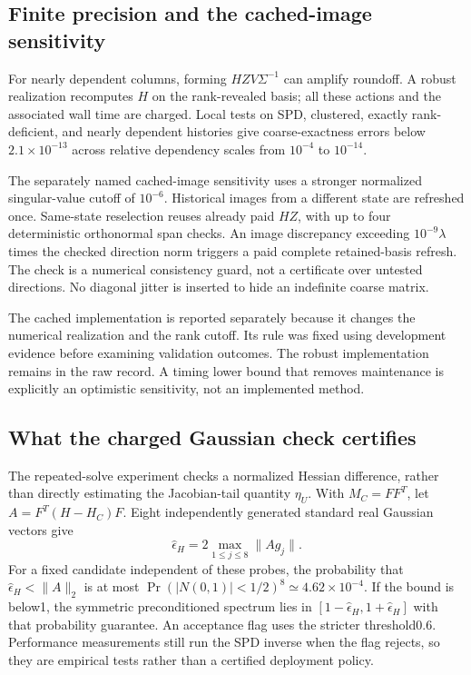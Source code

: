 \subsection*{Finite precision and the cached-image sensitivity}
For nearly dependent columns, forming $HZV\Sigma^{-1}$ can amplify roundoff. A robust realization recomputes $H$ on the rank-revealed basis; all these actions and the associated wall time are charged. Local tests on SPD, clustered, exactly rank-deficient, and nearly dependent histories give coarse-exactness errors below $2.1\times10^{-13}$ across relative dependency scales from $10^{-4}$ to $10^{-14}$.

The separately named cached-image sensitivity uses a stronger normalized singular-value cutoff of $10^{-6}$. Historical images from a different state are refreshed once. Same-state reselection reuses already paid $HZ$, with up to four deterministic orthonormal span checks. An image discrepancy exceeding $10^{-9}\lambda$ times the checked direction norm triggers a paid complete retained-basis refresh. The check is a numerical consistency guard, not a certificate over untested directions. No diagonal jitter is inserted to hide an indefinite coarse matrix.

The cached implementation is reported separately because it changes the numerical realization and the rank cutoff. Its rule was fixed using development evidence before examining validation outcomes. The robust implementation remains in the raw record. A timing lower bound that removes maintenance is explicitly an optimistic sensitivity, not an implemented method.

\subsection*{What the charged Gaussian check certifies}
The repeated-solve experiment checks a normalized Hessian difference, rather than directly estimating the Jacobian-tail quantity $\eta_U$. With $M_C=FF^T$, let $A=F^T(H-H_C)F$. Eight independently generated standard real Gaussian vectors give
\[
\widehat\epsilon_H=2\max_{1\le j\le8}\|Ag_j\|.
\]
For a fixed candidate independent of these probes, the probability that $\widehat\epsilon_H<\|A\|_2$ is at most $\Pr(|N(0,1)|<1/2)^8\simeq4.62\times10^{-4}$. If the bound is below1, the symmetric preconditioned spectrum lies in $[1-\widehat\epsilon_H,1+\widehat\epsilon_H]$ with that probability guarantee. An acceptance flag uses the stricter threshold0.6. Performance measurements still run the SPD inverse when the flag rejects, so they are empirical tests rather than a certified deployment policy.

